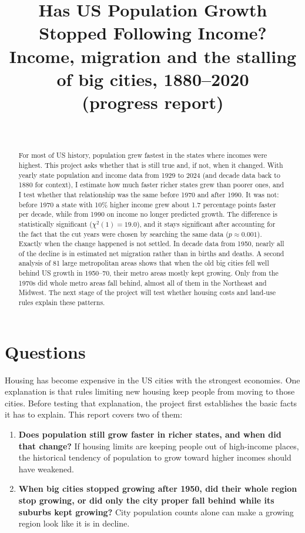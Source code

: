 \documentclass[11pt]{article}
\title{Has US Population Growth Stopped Following Income?\\[4pt]
\large Income, migration and the stalling of big cities, 1880--2020\\
(progress report)}
\author{\studentname\\ \coursename}
\date{\reportdate}
\begin{document}
\maketitle

\begin{abstract}
For most of US history, population grew fastest in the states where incomes were highest. This
project asks whether that is still true and, if not, when it changed. With yearly state population
and income data from 1929 to 2024 (and decade data back to 1880 for context), I estimate how much
faster richer states grew than poorer ones, and I test whether that relationship was the same before
1970 and after 1990. It was not: before 1970 a state with 10\% higher income grew about 1.7
percentage points faster per decade, while from 1990 on income no longer predicted growth. The
difference is statistically significant ($\chi^2(1) = 19.0$), and it stays significant after
accounting for the fact that the cut years were chosen by searching the same data ($p \approx
0.001$). Exactly when the change happened is not settled. In decade data from 1950, nearly all of the
decline is in estimated net migration rather than in births and deaths. A second analysis of 81
large metropolitan areas shows that when the old big cities fell well behind US growth in 1950--70,
their metro areas mostly kept growing. Only from the 1970s did whole metro areas fall behind, almost
all of them in the Northeast and Midwest. The next stage of the project will test whether housing
costs and land-use rules explain these patterns.
\end{abstract}

\section{Questions}

Housing has become expensive in the US cities with the strongest economies. One explanation is that
rules limiting new housing keep people from moving to those cities. Before testing that
explanation, the project first establishes the basic facts it has to explain. This report covers
two of them:

\begin{enumerate}[label=\textbf{Q\arabic*.}]
  \item \textbf{Does population still grow faster in richer states, and when did that change?}
        If housing limits are keeping people out of high-income places, the historical tendency of
        population to grow toward higher incomes should have weakened.
  \item \textbf{When big cities stopped growing after 1950, did their whole region stop growing, or
        did only the city proper fall behind while its suburbs kept growing?} City population counts
        alone can make a growing region look like it is in decline.
\end{enumerate}
\end{document}
